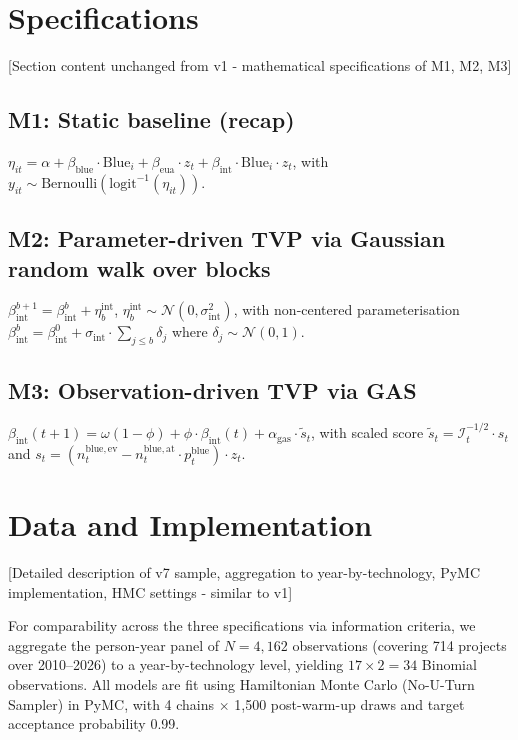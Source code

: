 \documentclass[11pt,a4paper]{article}
\newcommand{\bint}{\beta_{\mathrm{int}}}
\newcommand{\bblue}{\beta_{\mathrm{blue}}}
\newcommand{\beua}{\beta_{\mathrm{eua}}}
\begin{document}
\section{Specifications}
\label{sec:ch7-specifications}
\label{sec:ch7-spec}

[Section content unchanged from v1 - mathematical specifications of M1, M2, M3]

\subsection*{M1: Static baseline (recap)}
$\eta_{it} = \alpha + \bblue \cdot \mathrm{Blue}_i + \beua \cdot z_t + \bint \cdot \mathrm{Blue}_i \cdot z_t$,
with $y_{it} \sim \mathrm{Bernoulli}(\mathrm{logit}^{-1}(\eta_{it}))$.

\subsection*{M2: Parameter-driven TVP via Gaussian random walk over blocks}
$\bint^{b+1} = \bint^b + \eta_b^{\mathrm{int}}$, $\eta_b^{\mathrm{int}} \sim \mathcal{N}(0, \sigma^2_{\mathrm{int}})$, with non-centered parameterisation $\bint^b = \bint^0 + \sigma_{\mathrm{int}} \cdot \sum_{j \leq b} \delta_j$ where $\delta_j \sim \mathcal{N}(0,1)$.

\subsection*{M3: Observation-driven TVP via GAS}
$\bint(t+1) = \omega(1-\phi) + \phi \cdot \bint(t) + \alpha_{\mathrm{gas}} \cdot \tilde{s}_t$,
with scaled score $\tilde{s}_t = \mathcal{I}_t^{-1/2} \cdot s_t$ and $s_t = (n_t^{\mathrm{blue, ev}} - n_t^{\mathrm{blue, at}} \cdot p_t^{\mathrm{blue}}) \cdot z_t$.

\section{Data and Implementation}
\label{sec:ch7-data}

[Detailed description of v7 sample, aggregation to year-by-technology, PyMC implementation, HMC settings - similar to v1]

For comparability across the three specifications via information criteria, we aggregate the person-year panel of $N = 4{,}162$ observations (covering 714 projects over 2010--2026) to a year-by-technology level, yielding $17 \times 2 = 34$ Binomial observations. All models are fit using Hamiltonian Monte Carlo (No-U-Turn Sampler) in PyMC, with 4 chains $\times$ 1{,}500 post-warm-up draws and target acceptance probability 0.99.
\end{document}
